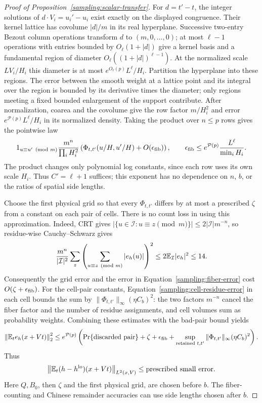 \begin{proof}[Proof of Proposition~\ref{sampling:scalar-transfer}]
For $d=t'-t$, the integer solutions of $d\cdot V_i=u_i'-u_i$ exist
exactly on the displayed congruence.  Their kernel lattice has covolume
$|d|/m$ in its real hyperplane.  Successive two-entry Bezout column
operations transform $d$ to $(m,0,\ldots,0)$; at most $\ell-1$ operations
with entries bounded by $O_\ell(1+|d|)$ give a kernel basis and a
fundamental region of diameter $O_\ell((1+|d|)^{\ell-1})$.
At the normalized scale $LV_i/H_i$ this diameter is at most
$e^{O_\ell(p)}L^\ell/H_i$.  Partition the hyperplane into these regions.
The error between the smooth weight at a lattice point and its integral
over the region is bounded by its derivative times the diameter; only
regions meeting a fixed bounded enlargement of the support contribute.
After normalization, coarea and the covolume give the row factor
$m/H_i^2$ and error $e^{\mathcal P(p)}L^\ell/H_i$ in its normalized
density.  Taking the product over $n\le p$ rows gives the pointwise law
\begin{equation}\label{sampling:fiber-error}
 1_{u\equiv u'\pmod m}\frac{m^n}{\prod_iH_i^2}
 \left(\Phi_{t,t'}(u/H,u'/H)+O(\epsilon_{\rm fib})\right),
 \qquad
 \epsilon_{\rm fib}\le e^{\mathcal P(p)}\frac{L^\ell}{\min_iH_i}.
\end{equation}
The product changes only polynomial log constants, since each row uses
its own scale $H_i$.  Thus $C'=\ell+1$ suffices; this exponent has no
dependence on $n$, $b$, or the ratios of spatial side lengths.

Choose the first physical grid so that every $\Phi_{t,t'}$ differs by
at most a prescribed $\zeta$ from a constant on each pair of cells.
There is no count loss in using this approximation.  Indeed, CRT gives
$|\{u\in\mathcal I:u\equiv z\pmod m\}|\le2|\mathcal I|m^{-n}$,
so residue-wise Cauchy--Schwarz gives
\[
 \frac{m^n}{|\mathcal I|^2}
 \sum_z\left(\sum_{u\equiv z\pmod m}|e_h(u)|\right)^2
 \le2\mathbb E_{\mathcal I}|e_h|^2\le14.
\]
Consequently the grid error and the error in
Equation~\eqref{sampling:fiber-error} cost $O(\zeta+\epsilon_{\rm fib})$.
For the cell-pair constants, Equation~\eqref{sampling:cell-residue-error}
in each cell bounds the sum by
$\|\Phi_{t,t'}\|_\infty(\eta C_b)^2$: the two factors $m^{-n}$ cancel
the fiber factor and the number of residue assignments, and cell volumes
sum as probability weights.  Combining these estimates with the bad-pair
bound yields
\[
 \left\|\mathbb E_t e_h(x+Vt)\right\|_2^2
 \le e^{\mathcal P(p)}\left(
 \Pr\{\text{discarded pair}\}+\zeta+\epsilon_{\rm fib}
 +\sup_{\text{retained }t,t'}\|\Phi_{t,t'}\|_\infty(\eta C_b)^2\right).
\]
Thus
\[
 \left\|\mathbb E_t(h-h^{\mathrm{lo}})(x+Vt)\right\|_{L^2(x,V)}
 \le\text{prescribed small error}.
\]
Here $Q,B_0$, then $\zeta$ and the first physical grid, are chosen before
$b$.  The fiber-counting and Chinese remainder accuracies can use side
lengths chosen after $b$.


\end{proof}
